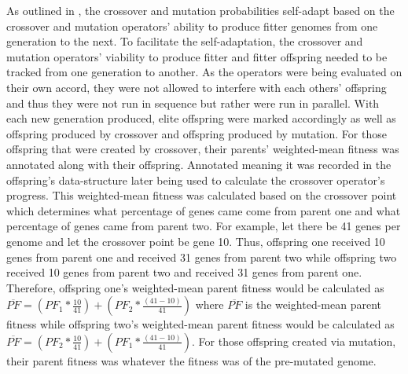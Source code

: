 \documentclass[a4paper,10pt]{article}
\begin{document}
As outlined in \cite{self_adapt}, the crossover and mutation probabilities self-adapt based on the crossover and mutation operators' ability to produce fitter genomes from one generation to the next. To facilitate the self-adaptation, the crossover and mutation operators' viability to produce fitter and fitter offspring needed to be tracked from one generation to another. As the operators were being evaluated on their own accord, they were not allowed to interfere with each others' offspring and thus they were not run in sequence but rather were run in parallel. With each new generation produced, elite offspring were marked accordingly as well as offspring produced by crossover and offspring produced by mutation. For those offspring that were created by crossover, their parents' weighted-mean fitness was annotated along with their offspring. Annotated meaning it was recorded in the offspring's data-structure later being used to calculate the crossover operator's progress. This weighted-mean fitness was calculated based on the crossover point which determines what percentage of genes came come from parent one and what percentage of genes came from parent two. For example, let there be 41 genes per genome and let the crossover point be gene 10. Thus, offspring one received 10 genes from parent one and received 31 genes from parent two while offspring two received 10 genes from parent two and received 31 genes from parent one. Therefore, offspring one's weighted-mean parent fitness would be calculated as $\overline{PF} = \left ( PF_1 * \frac{10}{41} \right ) + \left (PF_2 * \frac{(41-10)}{41} \right)$ where $\overline{PF}$ is the weighted-mean parent fitness while offspring two's weighted-mean parent fitness would be calculated as $\overline{PF} = \left ( PF_2 * \frac{10}{41} \right ) + \left (PF_1 * \frac{(41-10)}{41} \right)$. For those offspring created via mutation, their parent fitness was whatever the fitness was of the pre-mutated genome. 
\end{document}
